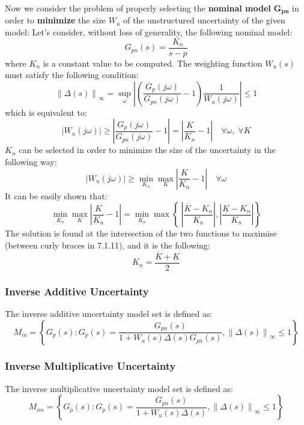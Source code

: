 \documentclass[a4paper,10pt,titlepage]{article}
\numberwithin{equation}{subsection}
\begin{document}
	\raggedright
	Now we consider the problem of properly selecting the \textbf{nominal model} $\bm{G_{pn}}$ in order to \textbf{minimize} the size $W_u$ of the unstructured uncertainty of the given model:
	Let's consider, without loss of generality, the following nominal model:
	\begin{equation}
		G_{pn}(s) = \dfrac{K_n}{s-p}
	\end{equation}
	where $K_n$ is a constant value to be computed.
	The weighting function $W_u(s)$ must satisfy the following condition:
	\begin{equation}
		\left\lVert \Delta(s) \right\rVert_\infty = \sup_\omega \left| \left( \dfrac{G_p(j\omega)}{G_{pn}(j\omega)}-1 \right) \dfrac{1}{W_u(j\omega)} \right| \leq 1
	\end{equation}
	which is equivalent to:
	\begin{equation}
		\left| W_u(j\omega) \right| \geq \left| \dfrac{G_p(j\omega)}{G_{pn}(j\omega)}-1 \right| = \left| \dfrac{K}{K_n}-1 \right| \quad \forall\omega,\;\forall K 
	\end{equation}
	$K_n$ can be selected in order to minimize the size of the uncertainty in the following way:
	\begin{equation}
		\left| W_u(j\omega) \right| \geq \min_{K_n}\max_K \left| \dfrac{K}{K_n}-1 \right| \quad \forall\omega
	\end{equation}
	It can be easily shown that:
	\begin{equation}
		\min_{K_n}\max_K \left| \dfrac{K}{K_n}-1 \right| = \min_{K_n}\max \left\{\ \left| \dfrac{\overline{K}-K_n}{K_n} \right|, \left| \dfrac{\underline{K}-K_n}{K_n} \right| \right\}
	\end{equation}
	The solution is found at the intersection of the two functions to maximise (between curly braces in 7.1.11), and it is the following:
	\begin{equation}
		K_n = \dfrac{\overline{K}+\underline{K}}{2}
	\end{equation}
	
	\subsubsection{Inverse Additive Uncertainty}
	The inverse additive uncertainty model set is defined as:
	\begin{equation}
		M_{ia} = \left\{ G_p(s): G_p(s)= \dfrac{G_{pn}(s)}{1+W_u(s)\Delta(s)G_{pn}(s)}, \left\lVert\Delta(s)\right\rVert_\infty \leq1 \right\}
	\end{equation}
	\subsubsection{Inverse Multiplicative Uncertainty}
	The inverse multiplicative uncertainty model set is defined as:
	\begin{equation}
		M_{im} = \left\{ G_p(s): G_p(s)= \dfrac{G_{pn}(s)}{1+W_u(s)\Delta(s)}, \left\lVert\Delta(s)\right\rVert_\infty \leq1 \right\}
	\end{equation}
	
\end{document}
